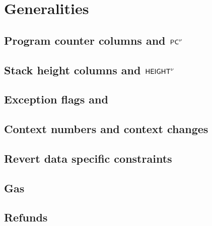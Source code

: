 
\section{Generalities}                                                                           \label{hub: generalities}
\subsection{Program counter columns \pc{} and $\textsf{PC}^{\nu}$                            \lispDone{}}  \label{hub: generalities: program counter}                                 
\subsection{Stack height columns \height{} and $\textsf{HEIGHT}^{\nu}$                       \lispTodo{}}  \label{hub: generalities: stack height}                                    
\subsection{Exception flags and \XAHOY{}                                           \lispDone{}}  \label{hub: generalities: exceptions}                                      
\subsection{Context numbers and context changes                                    \lispDone{}}  \label{hub: generalities: context changes}                                 
\subsection{Revert data specific constraints                                       \lispDone{}}  \label{hub: generalities: revert}                                          
\subsection{Gas                                                                    \lispTodo{}}  \label{hub: generalities: gas}                                             
\subsection{Refunds                                                                \lispTodo{}}  \label{hub: generalities: refunds}                                         
